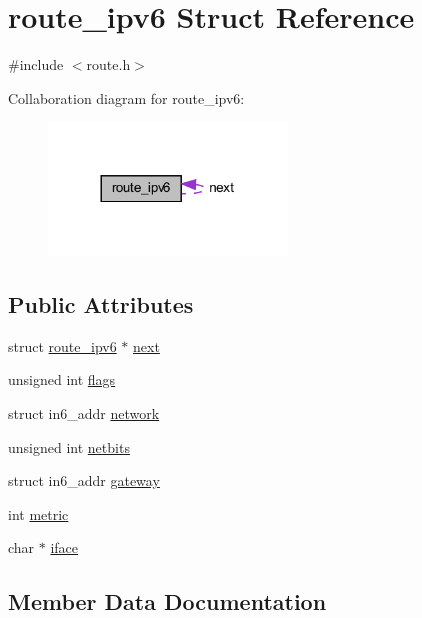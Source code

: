 \hypertarget{structroute__ipv6}{}\section{route\+\_\+ipv6 Struct Reference}
\label{structroute__ipv6}


{\ttfamily \#include $<$route.\+h$>$}



Collaboration diagram for route\+\_\+ipv6\+:
\nopagebreak
\begin{figure}[H]
\begin{center}
\leavevmode
\includegraphics[width=180pt]{structroute__ipv6__coll__graph}
\end{center}
\end{figure}
\subsection*{Public Attributes}
\begin{DoxyCompactItemize}
\item 
struct \hyperlink{structroute__ipv6}{route\+\_\+ipv6} $\ast$ \hyperlink{structroute__ipv6_a636a9acc728a4c83d04eee418979d775}{next}
\item 
unsigned int \hyperlink{structroute__ipv6_a6bcf2e42012b24c9ec6897da1cea73c4}{flags}
\item 
struct in6\+\_\+addr \hyperlink{structroute__ipv6_a9d9f0b0a90d55aae4f2e21163f9cba94}{network}
\item 
unsigned int \hyperlink{structroute__ipv6_a40dd9f967f1b9865ab733329dff9eb78}{netbits}
\item 
struct in6\+\_\+addr \hyperlink{structroute__ipv6_a1253ae18a7713ae72b30a669a0bf6ae5}{gateway}
\item 
int \hyperlink{structroute__ipv6_ab356df748374308f70a7f7495fdb4a4c}{metric}
\item 
char $\ast$ \hyperlink{structroute__ipv6_a0231c86192747964378ae3b96d7f1eed}{iface}
\end{DoxyCompactItemize}


\subsection{Member Data Documentation}
\hypertarget{structroute__ipv6_a6bcf2e42012b24c9ec6897da1cea73c4}{}
